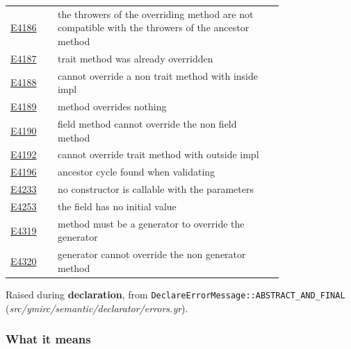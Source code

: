 \begin{longtable}{@{}l p{0.78\linewidth} r@{}}
\hyperref[sec:codes:e4186]{E4186} & the throwers of the overriding method \errhole{} are not compatible with the throwers of the ancestor method \errhole{} & \pageref{sec:codes:e4186}\\
\hyperref[sec:codes:e4187]{E4187} & trait method \errhole{} was already overridden & \pageref{sec:codes:e4187}\\
\hyperref[sec:codes:e4188]{E4188} & cannot override a non trait method \errhole{} with \errhole{} inside impl & \pageref{sec:codes:e4188}\\
\hyperref[sec:codes:e4189]{E4189} & method \errhole{} overrides nothing & \pageref{sec:codes:e4189}\\
\hyperref[sec:codes:e4190]{E4190} & field method \errhole{} cannot override the non field method \errhole{} & \pageref{sec:codes:e4190}\\
\hyperref[sec:codes:e4192]{E4192} & cannot override trait method \errhole{} with \errhole{} outside impl & \pageref{sec:codes:e4192}\\
\hyperref[sec:codes:e4196]{E4196} & ancestor cycle found when validating \errhole{} & \pageref{sec:codes:e4196}\\
\hyperref[sec:codes:e4233]{E4233} & no constructor is callable with the parameters \errhole{} & \pageref{sec:codes:e4233}\\
\hyperref[sec:codes:e4253]{E4253} & the field \errhole{} has no initial value & \pageref{sec:codes:e4253}\\
\hyperref[sec:codes:e4319]{E4319} & method \errhole{} must be a generator to override the generator \errhole{} & \pageref{sec:codes:e4319}\\
\hyperref[sec:codes:e4320]{E4320} & generator \errhole{} cannot override the non generator method \errhole{} & \pageref{sec:codes:e4320}\\
\bottomrule
\end{longtable}

\label{sec:codes:e3001}

Raised during \textbf{declaration}, from \texttt{DeclareErrorMessage::\allowbreak{}ABSTRACT\_\allowbreak{}AND\_\allowbreak{}FINAL} (\textit{src/\allowbreak{}ymirc/\allowbreak{}semantic/\allowbreak{}declarator/\allowbreak{}errors.yr}).

\subsubsection*{What it means}

